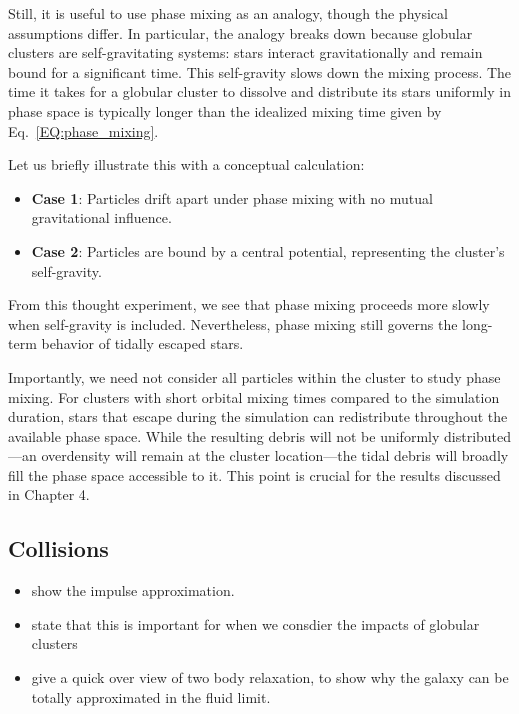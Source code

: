             Still, it is useful to use phase mixing as an analogy, though the physical assumptions differ. In particular, the analogy breaks down because globular clusters are self-gravitating systems: stars interact gravitationally and remain bound for a significant time. This self-gravity slows down the mixing process. The time it takes for a globular cluster to dissolve and distribute its stars uniformly in phase space is typically longer than the idealized mixing time given by Eq.~\ref{EQ:phase_mixing}.

            Let us briefly illustrate this with a conceptual calculation:

            \begin{itemize}
                \item \textbf{Case 1}: Particles drift apart under phase mixing with no mutual gravitational influence.
                \item \textbf{Case 2}: Particles are bound by a central potential, representing the cluster's self-gravity.
            \end{itemize}
            From this thought experiment, we see that phase mixing proceeds more slowly when self-gravity is included. Nevertheless, phase mixing still governs the long-term behavior of tidally escaped stars.

            Importantly, we need not consider all particles within the cluster to study phase mixing. For clusters with short orbital mixing times compared to the simulation duration, stars that escape during the simulation can redistribute throughout the available phase space. While the resulting debris will not be uniformly distributed—an overdensity will remain at the cluster location—the tidal debris will broadly fill the phase space accessible to it. This point is crucial for the results discussed in Chapter 4.

            
    \subsection{Collisions}

        \begin{itemize}
            \item show the impulse approximation.
            \item state that this is important for when we consdier the impacts of globular clusters
            \item give a quick over view of two body relaxation, to show why the galaxy can be totally approximated in the fluid limit.
        \end{itemize}

